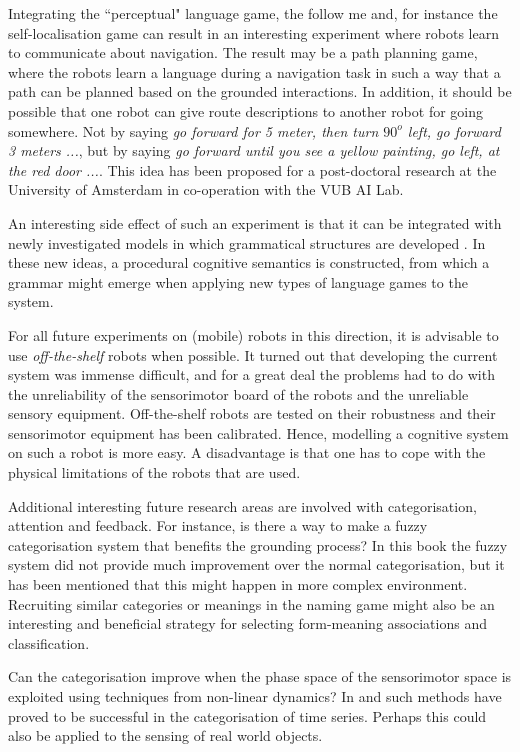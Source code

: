 Integrating the ``perceptual" language game, the follow me and, for instance the self-localisation game can result in an interesting experiment where robots learn to communicate about navigation. The result may be a {\sc path planning game}, where the robots learn a language during a navigation task in such a way that a path can be planned based on the grounded interactions. In addition, it should be possible that one robot can give route descriptions to another robot for going somewhere. Not by saying {\it go forward for 5 meter, then turn $90^o$ left, go forward 3 meters ...}, but by saying {\it go forward until you see a yellow painting, go left, at the red door ...}. This idea has been proposed for a post-doctoral research at the University of Amsterdam in co-operation with the VUB AI Lab.

An interesting side effect of such an experiment is that it can be integrated with newly investigated models in which grammatical structures are developed \citep{steels:2000a}. In these new ideas, a procedural cognitive semantics is constructed, from which a grammar might emerge when applying new types of language games to the system.

For all future experiments on (mobile) robots in this direction, it is advisable to use {\em off-the-shelf} robots when possible. It turned out that developing the current system was immense difficult, and for a great deal the problems had to do with the unreliability of the sensorimotor board of the robots and the unreliable sensory equipment. Off-the-shelf robots are tested on their robustness and their sensorimotor equipment has been calibrated. Hence, modelling a cognitive system on such a robot is more easy. A disadvantage is that one has to cope with the physical limitations of the robots that are used.


Additional interesting future research areas are involved with categorisation, attention and feedback. For instance, is there a way to make a fuzzy categorisation system that benefits the grounding process? In this book the fuzzy system did not provide much improvement over the normal categorisation, but it has been mentioned that this might happen in more complex environment. Recruiting similar categories or meanings in the naming game \citep{kaplan:2000} might also be an interesting and beneficial strategy for selecting form-meaning associations and classification.

Can the categorisation improve when the phase space of the sensorimotor space is exploited using techniques from non-linear dynamics? In \citet{rosenstein:1998a} and \citet{vogt:1999a} such methods have proved to be successful in the categorisation of time series. Perhaps this could also be applied to the sensing of real world objects. 

